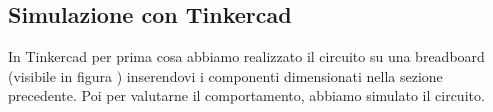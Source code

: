 \documentclass{report}
\begin{document}
\subsection{Simulazione con Tinkercad}\label{tinkercad}
In Tinkercad per prima cosa abbiamo realizzato il circuito su una breadboard (visibile in figura ) inserendovi i componenti dimensionati nella sezione precedente.
Poi per valutarne il comportamento, abbiamo simulato il circuito.
\end{document}
